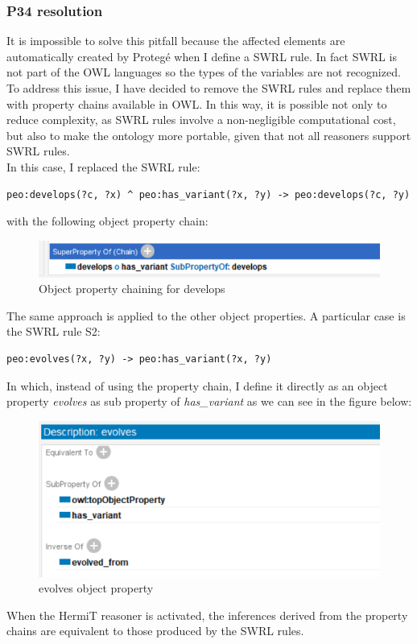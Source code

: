 \subsubsection{P34 resolution}
It is impossible to solve this pitfall because the affected elements are automatically created by Protegé when I define a SWRL rule. In fact SWRL is not part of the OWL languages so the types of the variables are not recognized. To address this issue, I have decided to remove the SWRL rules and replace them with property chains available in OWL. In this way, it is possible not only to reduce complexity, as SWRL rules involve a non-negligible computational cost, but also to make the ontology more portable, given that not all reasoners support SWRL rules.\\
In this case, I replaced the SWRL rule:
\begin{lstlisting}
peo:develops(?c, ?x) ^ peo:has_variant(?x, ?y) -> peo:develops(?c, ?y)
\end{lstlisting}
with the following object property chain:
\begin{figure}[H]
    \centering
    \includegraphics[width=0.7\linewidth]{Figures/fig_81.png}
    \caption{Object property chaining for develops}
    \label{fig:enter-label}
\end{figure}
The same approach is applied to the other object properties. A particular case is the SWRL rule S2: 
\begin{lstlisting}
peo:evolves(?x, ?y) -> peo:has_variant(?x, ?y)
\end{lstlisting}
In which, instead of using the property chain, I define it directly as an object property \textit{evolves} as sub property of \textit{has\_variant} as we can see in the figure below:
\begin{figure}[H]
    \centering
    \includegraphics[width=0.9\linewidth]{Figures/fig_82.png}
    \caption{evolves object property}
    \label{fig:enter-label}
\end{figure}
When the HermiT reasoner is activated, the inferences derived from the property chains are equivalent to those produced by the SWRL rules.

